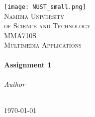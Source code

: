 \begin{titlepage}
        \begin{center}

                \vspace*{0.2cm}
                \texttt{[image: NUST\_small.png]}\\[0.3cm]
                \textsc{\LARGE Namibia University}\\[0.25cm]
                \textsc{\LARGE of Science and Technology}\\[1.6cm]
                \textsc{\Large MMA710S}\\[0.5cm]
                \textsc{\Large Multimedia Applications}\\[0.5cm]

                \HRule\\[0.4cm]
                {\huge \bfseries Assignment 1}\\
                \vspace*{0.2cm}
                \HRule\\[1.6cm]

                \emph{Author}\\[0.1cm]
                \noindent{}\\[1cm]

                \vfill

                {\large \today}

        \end{center}
\end{titlepage}
